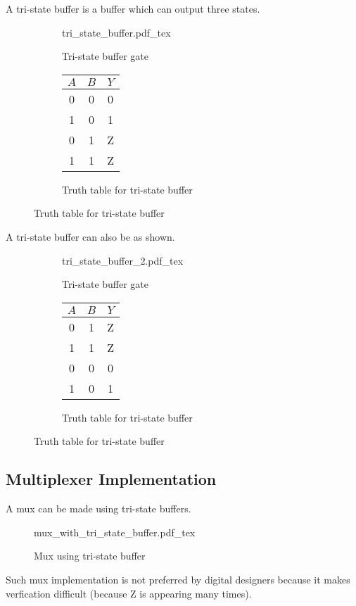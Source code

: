 \documentclass[oneside]{book}
\newcommand{\incfig}[1]{%
    {#1.pdf_tex}
}
\begin{document}
\noindent A tri-state buffer is a buffer which can output three states.
\begin{figure}[H]
	\centering
	\begin{subfigure}{0.45\linewidth}
		\centering
		\incfig{tri_state_buffer}
		\caption{Tri-state buffer gate}
	\end{subfigure}
	\begin{subfigure}{0.45\linewidth}
		\centering
		\begin{tabular}{|cc|c|}
			\hline
			$A$ & $B$ & $Y$ \\
			\hline
			0   & 0   & 0   \\
			1   & 0   & 1   \\
			0   & 1   & Z   \\
			1   & 1   & Z   \\
			\hline
		\end{tabular}
		\caption{Truth table for tri-state buffer}
	\end{subfigure}
\end{figure}

\noindent A tri-state buffer can also be as shown.
\begin{figure}[H]
	\centering
	\begin{subfigure}{0.45\linewidth}
		\centering
		\incfig{tri_state_buffer_2}
		\caption{Tri-state buffer gate}
	\end{subfigure}
	\begin{subfigure}{0.45\linewidth}
		\centering
		\begin{tabular}{|cc|c|}
			\hline
			$A$ & $B$ & $Y$ \\
			\hline
			0   & 1   & Z   \\
			1   & 1   & Z   \\
			0   & 0   & 0   \\
			1   & 0   & 1   \\
			\hline
		\end{tabular}
		\caption{Truth table for tri-state buffer}
	\end{subfigure}
\end{figure}

\subsection{Multiplexer Implementation}
A mux can be made using tri-state buffers.
\begin{figure}[ht]
	\centering
	\incfig{mux_with_tri_state_buffer}
	\caption{Mux using tri-state buffer}
\end{figure}
Such mux implementation is not preferred by digital designers because it makes verfication difficult (because Z is appearing many times).
\end{document}
